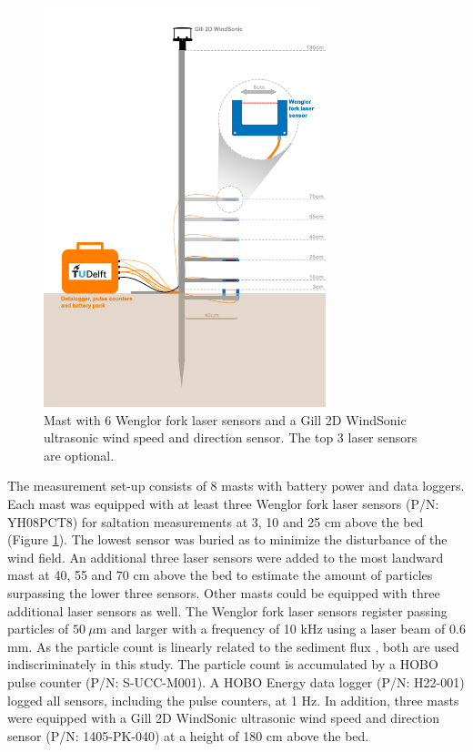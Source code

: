 \begin{figure}
 \centering
  \includegraphics[width=\columnwidth]{../Figures/mast_small}
  \caption{Mast with 6 Wenglor fork laser sensors and a Gill 2D
    WindSonic ultrasonic wind speed and direction sensor. The top 3
    laser sensors are optional.}
  \label{fig:mast}
\end{figure}

The measurement set-up consists of 8 masts with battery power and data
loggers. Each mast was equipped with at least three Wenglor fork laser
sensors (P/N: YH08PCT8) for saltation measurements at 3, 10 and 25 cm
above the bed (Figure \ref{fig:mast}). The lowest sensor was buried as
to minimize the disturbance of the wind field. An additional three
laser sensors were added to the most landward mast at 40, 55 and 70 cm
above the bed to estimate the amount of particles surpassing the lower
three sensors. Other masts could be equipped with three additional
laser sensors as well. The Wenglor fork laser sensors register passing
particles of $50 ~ \mu \mathrm{m}$ and larger with a frequency of 10
kHz using a laser beam of 0.6 mm. As the particle count is linearly
related to the sediment flux \citep{Barchyn2014}, both are used
indiscriminately in this study.  The particle count is accumulated by
a HOBO pulse counter (P/N: S-UCC-M001). A HOBO Energy data logger
(P/N: H22-001) logged all sensors, including the pulse counters, at 1
Hz. In addition, three masts were equipped with a Gill 2D WindSonic
ultrasonic wind speed and direction sensor (P/N: 1405-PK-040) at a
height of 180 cm above the bed.

